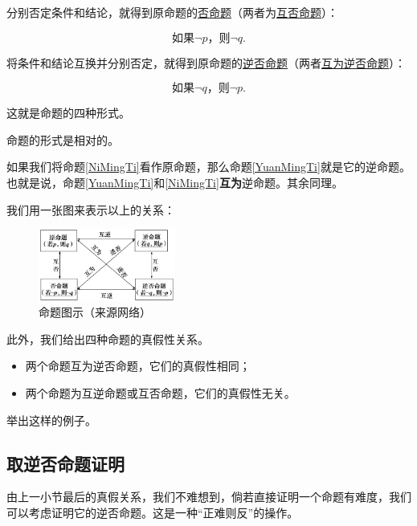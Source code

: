 \documentclass[lang=cn,math=cm,chinesefont=nofont,11pt,scheme=chinese,onecol]{elegantbook}
\begin{document}
分别否定条件和结论，就得到原命题的\underline{否命题}（两者为\underline{互否命题}）：

\begin{equation}\label{FouMingTi}
  \text{如果}\neg p\text{，则}\neg q.
\end{equation}

将条件和结论互换并分别否定，就得到原命题的\underline{逆否命题}（两者\underline{互为逆否命题}）：

\begin{equation}\label{NiFouMingTi}
  \text{如果}\neg q\text{，则}\neg p.
\end{equation}

这就是命题的四种形式。

命题的形式是相对的。

如果我们将命题\ref{NiMingTi}看作原命题，那么命题\ref{YuanMingTi}就是它的逆命题。也就是说，命题\ref{YuanMingTi}和\ref{NiMingTi}\textbf{互为}逆命题。其余同理。

我们用一张图来表示以上的关系：

\begin{figure}[h]
  \centering
  \includegraphics[width=0.4\textwidth]{image/proposition.png}
  \caption{命题图示（来源网络）}
  \label{img:proposition}
\end{figure}

此外，我们给出四种命题的真假性关系。

\begin{itemize}
  \item 两个命题互为逆否命题，它们的真假性相同；
  \item 两个命题为互逆命题或互否命题，它们的真假性无关。
\end{itemize}

\begin{problem}
  举出这样的例子。
\end{problem}

\subsection{取逆否命题证明}

由上一小节最后的真假关系，我们不难想到，倘若直接证明一个命题有难度，我们可以考虑证明它的逆否命题。这是一种“正难则反”的操作。
\end{document}
